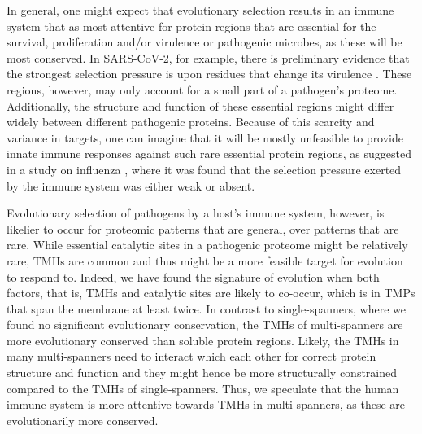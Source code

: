  
In general, one might expect that evolutionary selection results in
an immune system that as most attentive for protein regions that are
essential for the survival, proliferation and/or virulence or pathogenic microbes, 
as these will be most conserved.
In SARS-CoV-2, for example, there is preliminary evidence that the strongest
selection pressure is upon residues that change its 
virulence \cite{velazquez2020positive}.
These regions, however, may only account for a small part of a pathogen's proteome.
Additionally, the structure and function of these essential regions might differ widely between different pathogenic proteins.
Because of this scarcity and variance in targets, 
one can imagine that it will be mostly unfeasible 
to provide innate immune responses against such rare essential protein regions, 
as suggested in a study on influenza \cite{han2019individual},
where it was found that the selection pressure
exerted by the immune system was either weak or absent.
 

Evolutionary selection of pathogens by a host's immune system,
however, is likelier to occur for proteomic patterns that are general,
over patterns that are rare.
While essential catalytic sites in a pathogenic proteome
might be relatively rare, TMHs are common and thus might be a more feasible 
target for evolution to respond to.
Indeed, we have found the signature of evolution when both factors,
that is, TMHs and catalytic sites are likely to co-occur,
which is in TMPs that span the membrane at least twice.
In contrast to single-spanners, where we found no significant evolutionary conservation, the TMHs of multi-spanners are more evolutionary conserved than soluble protein regions. Likely, the TMHs in many multi-spanners need to interact which each other for correct protein structure and function and they might hence be more structurally constrained compared to the TMHs of single-spanners.
Thus, we speculate that the human immune system is more attentive 
towards TMHs in multi-spanners, as these are evolutionarily more conserved. 

